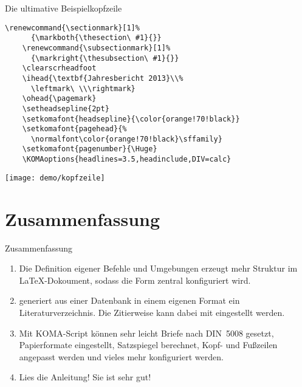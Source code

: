 \begin{Frame}[fragile]{Die ultimative Beispielkopfzeile}
  \begin{lstlisting}[gobble=4]
    \renewcommand{\sectionmark}[1]%
      {\markboth{\thesection\ #1}{}}
    \renewcommand{\subsectionmark}[1]%
      {\markright{\thesubsection\ #1}{}}
    \clearscrheadfoot
    \ihead{\textbf{Jahresbericht 2013}\\%
      \leftmark\ \\\rightmark}
    \ohead{\pagemark}
    \setheadsepline{2pt}
    \setkomafont{headsepline}{\color{orange!70!black}}
    \setkomafont{pagehead}{%
      \normalfont\color{orange!70!black}\sffamily}
    \setkomafont{pagenumber}{\Huge}
    \KOMAoptions{headlines=3.5,headinclude,DIV=calc}
  \end{lstlisting}

  \texttt{[image: demo/kopfzeile]}
\end{Frame}

\section*{Zusammenfassung}

\begin{frame}[fragile]{Zusammenfassung}
  \begin{enumerate}
    \item Die Definition \alert{eigener Befehle und Umgebungen}
      erzeugt \alert{mehr Struktur} im \LaTeX-Dokoument, sodass die
      \alert{Form zentral konfiguriert} wird.
    \item \alert{\BibTeX} generiert aus einer \alert{Datenbank} in einem eigenen Format
      ein \alert{Literaturverzeichnis}. Die \alert{Zitierweise} kann dabei mit
      \lstinline-- eingestellt werden.
    \item Mit \alert{KOMA-Script} können sehr leicht \alert{Briefe
          nach DIN~5008} gesetzt, \alert{Papierformate} eingestellt, \alert{Satzspiegel}
      berechnet, \alert{Kopf- und Fußzeilen} angepasst werden und vieles
      mehr konfiguriert werden.
    \item \alert{Lies die Anleitung! Sie ist sehr gut!}
  \end{enumerate}
\end{frame}

